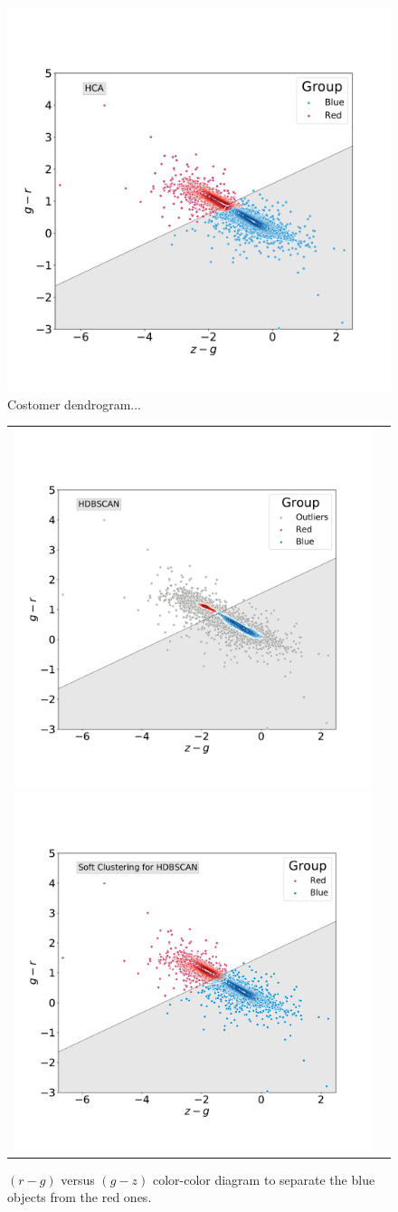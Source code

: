 \documentclass[fleqn,usenatbib]{mnras}
\begin{document}
{\begin{figure}
	\includegraphics[width=0.9\linewidth]{Figs/blued-red-hierarchical.pdf}
    \caption{Costomer dendrogram...}
    \label{fig:hierar}
\end{figure}

\begin{figure}
\centering
\begin{tabular}{l l}
  \includegraphics[width=0.5\linewidth, trim=10 10 5 8, clip]{Figs/blued-red-hdbscan.pdf}
   \includegraphics[width=0.5\linewidth, trim=10 10 5 8. clip]{Figs/blue-red-hdbscan-soft-alternative.pdf}
  \end{tabular}  
  \caption{ $(r - g)$ versus $(g - z)$ color-color diagram to separate the blue objects from the red ones.}
\label{fig:hdbscan}
\end{figure}


}
\end{document}
